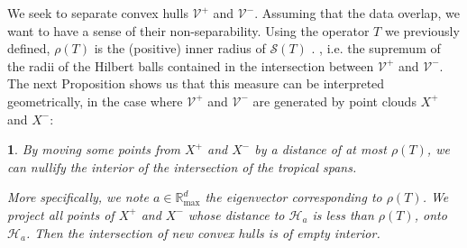 \documentclass[oneside,english,a4paper]{amsart}
\numberwithin{equation}{section}
\numberwithin{figure}{section}
\theoremstyle{plain}
\theoremstyle{definition}
\theoremstyle{plain}
\newtheorem{prop}[thm]{\protect\propositionname}
\theoremstyle{remark}
\theoremstyle{plain}
\theoremstyle{definition}
\theoremstyle{definition}
\providecommand{\propositionname}{Proposition}
\begin{document}
We seek to separate convex hulls $\mathcal{V}^{+}$ and $\mathcal{V}^{-}$.
Assuming that the data overlap, we want to have a sense of their
non-separability. Using the operator $T$ we previously defined,  $\rho(T)$ is the
(positive) inner radius of $\mathcal{S}(T)$ . \cite{Allamigeon2018} , i.e. the supremum of
the radii of the Hilbert balls contained in the intersection between
$\mathcal{V}^{+}$ and $\mathcal{V}^{-}$. The next Proposition shows
us that this measure can be interpreted geometrically, in the case
where $\mathcal{V}^{+}$ and $\mathcal{V}^{-}$ are generated by point
clouds $X^{+}$ and $X^{-}$:
\begin{prop}
By moving some points from $X^{+}$ and $X^{-}$ by a distance of
at most $\rho(T)$, we can nullify the interior of the intersection
of the tropical spans.

More specifically, we note $a\in\mathbb{R}_{\max}^{d}$ the eigenvector
corresponding to $\rho(T)$. We project all points of $X^{+}$ and
$X^{-}$ whose distance to $\mathcal{H}_{a}$ is less than $\rho(T)$,
onto $\mathcal{H}_{a}$. Then the intersection of new convex hulls
is of empty interior.
\end{prop}
\end{document}
